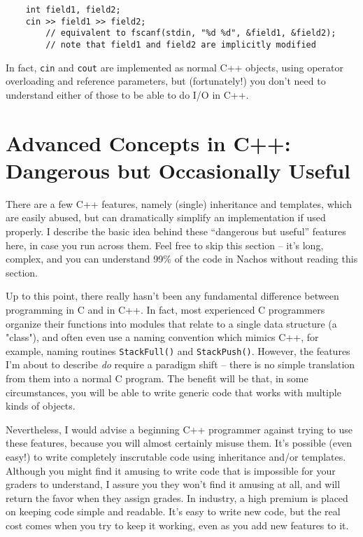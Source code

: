 \begin{enumerate}
\begin{verbatim}
    int field1, field2;
    cin >> field1 >> field2;
        // equivalent to fscanf(stdin, "%d %d", &field1, &field2);
        // note that field1 and field2 are implicitly modified
\end{verbatim}

In fact, {\tt cin} and {\tt cout} are implemented as normal C++
objects, using operator overloading and reference parameters, but
(fortunately!) you don't need to understand either of those to be able
to do I/O in C++.
\end{enumerate}

\section{Advanced Concepts in C++: Dangerous but Occasionally Useful}

There are a few C++ features, namely (single) inheritance and templates,
which are easily abused, but can dramatically simplify an
implementation if used properly.  I describe the basic idea
behind these ``dangerous but useful'' features here, in case you 
run across them.  Feel free to skip this section -- it's long,
complex, and you can understand 99\% of the code in Nachos without
reading this section.

Up to this point, there really hasn't been any fundamental difference
between programming in C and in C++.  In fact, most experienced 
C programmers organize their functions into modules that relate
to a single data structure (a "class"), and often even use a naming 
convention which mimics C++, for example, naming routines 
{\tt StackFull()} and {\tt StackPush()}.  However, the features 
I'm about to describe {\em do} require a paradigm shift -- there
is no simple translation from them into a normal C program.
The benefit will be that, in some circumstances, you will be able to 
write generic code that works with multiple kinds of objects.

Nevertheless, I would advise a beginning C++ programmer against trying
to use these features, because you will almost
certainly misuse them.  It's possible (even easy!) to write completely 
inscrutable code using inheritance and/or templates.  Although
you might find it amusing to write code that is impossible for your 
graders to understand, I assure you they won't find it amusing at all,
and will return the favor when they assign grades.  In industry,
a high premium is placed on keeping code simple and readable. 
It's easy to write new code, but the real cost comes when
you try to keep it working, even as you add new features to it.

